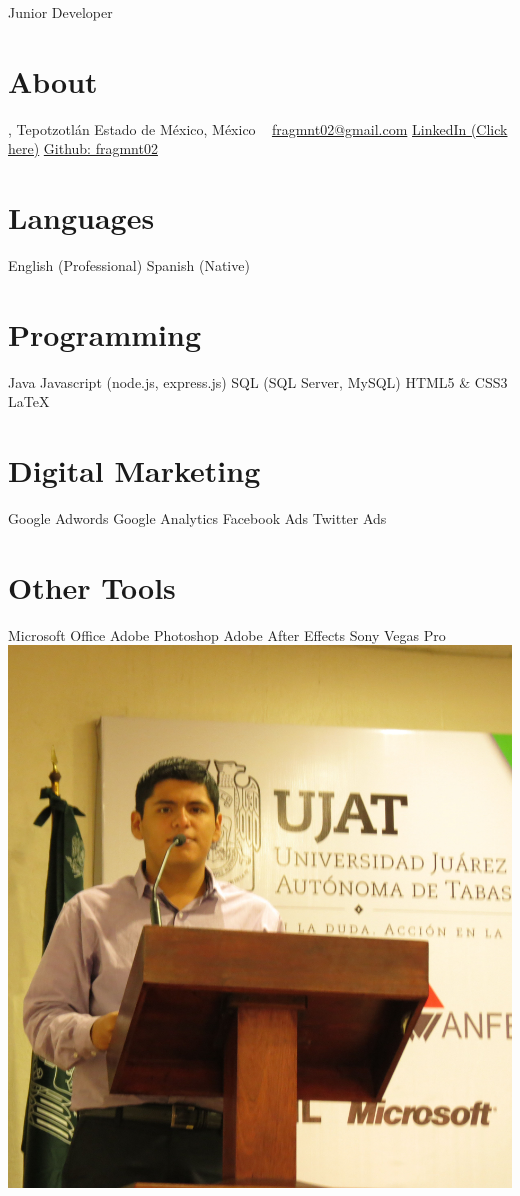 \documentclass[]{friggeri-cv}
\begin{document}
       {Junior Developer}
\begin{aside}
  \section{About},
    Tepotzotl\'{a}n
    Estado de M\'{e}xico,
    M\'{e}xico
    ~
    \href{mailto:fragmnt02@gmail.com}{fragmnt02@gmail.com}
    \href{https://www.linkedin.com/in/franciscorafaelarcegarcia}{LinkedIn (Click here)}
    \href{https://github.com/fragmnt02}{Github: fragmnt02}
  \section{Languages}
    English (Professional)
    Spanish (Native)
  \section{Programming}
    Java
    Javascript
    (node.js, express.js)
    SQL
    (SQL Server, MySQL)
    HTML5 \& CSS3
    LaTeX
  \section{Digital Marketing}
    Google Adwords
    Google Analytics
    Facebook Ads
    Twitter Ads
  \section{Other Tools}
    Microsoft Office
    Adobe Photoshop
    Adobe After Effects
    Sony Vegas Pro
    \includegraphics[scale=0.5]{yo}
\end{aside}
\end{document}
